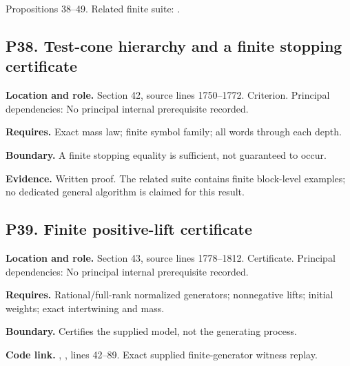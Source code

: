 \documentclass[11pt,oneside,openany]{book}
\numberwithin{equation}{section}
\begin{document}
Propositions 38--49. Related finite suite:
.

\par\noindent\begin{minipage}{\textwidth}
\subsection{P38. Test-cone hierarchy and a finite stopping
certificate}\label{LSMRegister:p38.-test-cone-hierarchy-and-a-finite-stopping-certificate}

\textbf{Location and role.} Section 42, source lines 1750--1772.
Criterion. Principal dependencies: No principal internal prerequisite
recorded.

\textbf{Requires.} Exact mass law; finite symbol family; all words
through each depth.

\textbf{Boundary.} A finite stopping equality is sufficient, not
guaranteed to occur.

\textbf{Evidence.} Written proof. The related suite contains finite
block-level examples; no dedicated general algorithm is claimed for this
result.
\end{minipage}\par\medskip

\par\noindent\begin{minipage}{\textwidth}
\subsection{P39. Finite positive-lift
certificate}\label{LSMRegister:p39.-finite-positive-lift-certificate}

\textbf{Location and role.} Section 43, source lines 1778--1812.
Certificate. Principal dependencies: No principal internal prerequisite
recorded.

\textbf{Requires.} Rational/full-rank normalized generators; nonnegative
lifts; initial weights; exact intertwining and mass.

\textbf{Boundary.} Certifies the supplied model, not the generating
process.

\textbf{Code link.} ,
, lines 42--89. Exact supplied
finite-generator witness replay.
\end{minipage}\par\medskip
\end{document}
